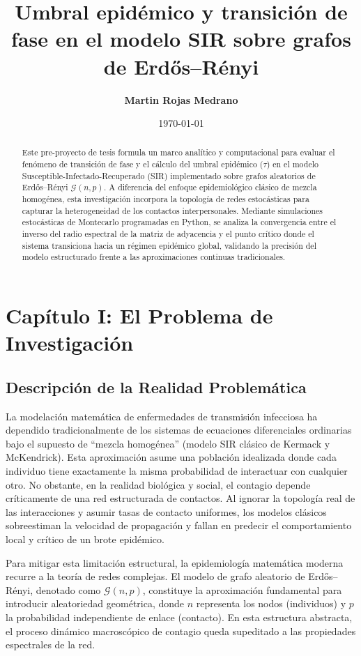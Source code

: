 \documentclass[12pt]{article}
\title{\textbf{Umbral epidémico y transición de fase en el modelo SIR sobre grafos de Erdős–Rényi}}
\author{\textbf{Martin Rojas Medrano}}
\date{\today}
\begin{document}
\maketitle

\strut

\begin{abstract}
Este pre-proyecto de tesis formula un marco analítico y computacional para evaluar el fenómeno de transición de fase y el cálculo del umbral epidémico ($\tau$) en el modelo Susceptible-Infectado-Recuperado (SIR) implementado sobre grafos aleatorios de Erdős–Rényi $\mathcal{G}(n,p)$. A diferencia del enfoque epidemiológico clásico de mezcla homogénea, esta investigación incorpora la topología de redes estocásticas para capturar la heterogeneidad de los contactos interpersonales. Mediante simulaciones estocásticas de Montecarlo programadas en Python, se analiza la convergencia entre el inverso del radio espectral de la matriz de adyacencia y el punto crítico donde el sistema transiciona hacia un régimen epidémico global, validando la precisión del modelo estructurado frente a las aproximaciones continuas tradicionales.
\end{abstract}

\newpage

\section{Capítulo I: El Problema de Investigación}

\subsection{Descripción de la Realidad Problemática}
La modelación matemática de enfermedades de transmisión infecciosa ha dependido tradicionalmente de los sistemas de ecuaciones diferenciales ordinarias bajo el supuesto de ``mezcla homogénea'' (modelo SIR clásico de Kermack y McKendrick). Esta aproximación asume una población idealizada donde cada individuo tiene exactamente la misma probabilidad de interactuar con cualquier otro. No obstante, en la realidad biológica y social, el contagio depende críticamente de una red estructurada de contactos. Al ignorar la topología real de las interacciones y asumir tasas de contacto uniformes, los modelos clásicos sobreestiman la velocidad de propagación y fallan en predecir el comportamiento local y crítico de un brote epidémico.

Para mitigar esta limitación estructural, la epidemiología matemática moderna recurre a la teoría de redes complejas. El modelo de grafo aleatorio de Erdős–Rényi, denotado como $\mathcal{G}(n, p)$, constituye la aproximación fundamental para introducir aleatoriedad geométrica, donde $n$ representa los nodos (individuos) y $p$ la probabilidad independiente de enlace (contacto). En esta estructura abstracta, el proceso dinámico macroscópico de contagio queda supeditado a las propiedades espectrales de la red.
\end{document}
